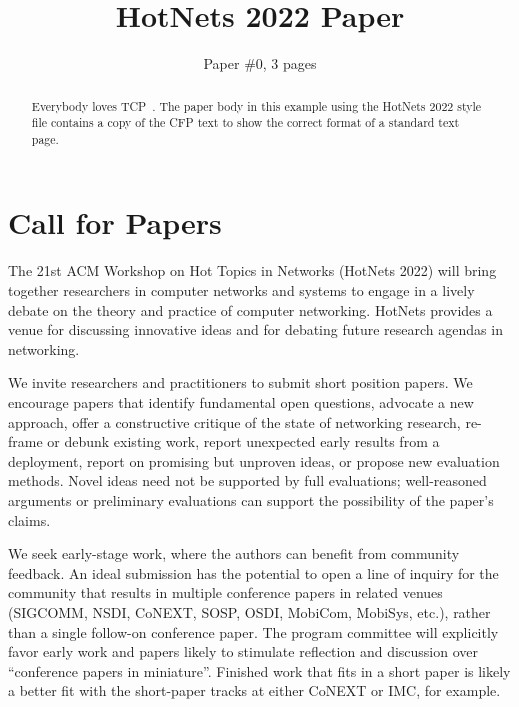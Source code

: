 \documentclass{proposal}
\begin{document}


\title{HotNets 2022 Paper}

\author{Paper \#0, 3 pages}

\maketitle

\begin{abstract}

Everybody loves TCP~\cite{vanjacobson}. The paper body in this example
using the HotNets 2022 style file contains a copy
of the CFP text to show the correct format of a standard text page.

\end{abstract}

\section{Call for Papers}

The 21st ACM Workshop on Hot Topics in Networks (HotNets 2022) will bring together researchers in computer networks and systems to engage in a lively debate on the theory and practice of computer networking. HotNets provides a venue for discussing innovative ideas and for debating future research agendas in networking.

We invite researchers and practitioners to submit short position papers. We encourage papers that identify fundamental open questions, advocate a new approach, offer a constructive critique of the state of networking research, re-frame or debunk existing work, report unexpected early results from a deployment, report on promising but unproven ideas, or propose new evaluation methods. Novel ideas need not be supported by full evaluations; well-reasoned arguments or preliminary evaluations can support the possibility of the paper's claims.

We seek early-stage work, where the authors can benefit from community feedback. An ideal submission has the potential to open a line of inquiry for the community that results in multiple conference papers in related venues (SIGCOMM, NSDI, CoNEXT, SOSP, OSDI, MobiCom, MobiSys, etc.), rather than a single follow-on conference paper. The program committee will explicitly favor early work and papers likely to stimulate reflection and discussion over ``conference papers in miniature''. Finished work that fits in a short paper is likely a better fit with the short-paper tracks at either CoNEXT or IMC, for example.
\end{document}
